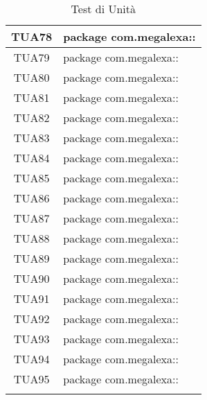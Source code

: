 \begin{longtable}{|c|m{28em}|}
	TUA78 & package com.megalexa::\\ \hline
	TUA79 & package com.megalexa::\\ \hline
	TUA80 & package com.megalexa::\\ \hline
	TUA81 & package com.megalexa::\\ \hline
	TUA82 & package com.megalexa::\\ \hline
	TUA83 & package com.megalexa::\\ \hline
	TUA84 & package com.megalexa::\\ \hline
	TUA85 & package com.megalexa::\\ \hline
	TUA86 & package com.megalexa::\\ \hline
	TUA87 & package com.megalexa::\\ \hline
	TUA88 & package com.megalexa::\\ \hline
	TUA89 & package com.megalexa::\\ \hline
	TUA90 & package com.megalexa::\\ \hline
	TUA91 & package com.megalexa::\\ \hline
	TUA92 & package com.megalexa::\\ \hline
	TUA93 & package com.megalexa::\\ \hline
	TUA94 & package com.megalexa::\\ \hline
	TUA95 & package com.megalexa::\\ \hline

	\caption[Test di Unità]{Test di Unità}
	\label{tabella:test2}
\end{longtable}
\clearpage
